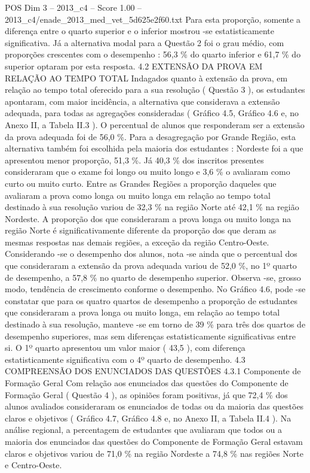 \begin{textsample}{POS Dim 3 – 2013\_c4 – Score 1.00 – 2013\_c4/enade\_2013\_med\_vet\_5d625e2f60.txt}
Para esta proporção, somente a diferença entre o quarto superior e o inferior mostrou -se estatisticamente significativa.
Já a alternativa modal para a Questão 2 foi o grau médio, com proporções crescentes com o desempenho : 56,3 \% do quarto inferior e 61,7 \% do superior optaram por esta resposta. 4.2 EXTENSÃO DA PROVA EM RELAÇÃO AO TEMPO TOTAL Indagados quanto à extensão da prova, em relação ao tempo total oferecido para a sua resolução ( Questão 3 ), os estudantes apontaram, com maior incidência, a alternativa que considerava a extensão adequada, para todas as agregações consideradas ( Gráfico 4.5, Gráfico 4.6 e, no Anexo II, a Tabela II.3 ).
O percentual de alunos que responderam ser a extensão da prova adequada foi de 56,0 \%.
Para a desagregação por Grande Região, esta alternativa também foi escolhida pela maioria dos estudantes : Nordeste foi a que apresentou menor proporção, 51,3 \%.
Já 40,3 \% dos inscritos presentes consideraram que o exame foi longo ou muito longo e 3,6 \% o avaliaram como curto ou muito curto.
Entre as Grandes Regiões a proporção daqueles que avaliaram a prova como longa ou muito longa em relação ao tempo total destinado à sua resolução variou de 32,3 \% na região Norte até 42,1 \% na região Nordeste.
A proporção dos que consideraram a prova longa ou muito longa na região Norte é significativamente diferente da proporção dos que deram as mesmas respostas nas demais regiões, a exceção da região Centro-Oeste.
Considerando -se o desempenho dos alunos, nota -se ainda que o percentual dos que consideraram a extensão da prova adequada variou de 52,0 \%, no 1º quarto de desempenho, a 57,8 \% no quarto de desempenho superior.
Observa -se, grosso modo, tendência de crescimento conforme o desempenho.
No Gráfico 4.6, pode -se constatar que para os quatro quartos de desempenho a proporção de estudantes que consideraram a prova longa ou muito longa, em relação ao tempo total destinado à sua resolução, manteve -se em torno de 39 \% para três dos quartos de desempenho superiores, mas sem diferenças estatisticamente significativas entre si.
O 1º quarto apresentou um valor maior ( 43,5 ), com diferença estatisticamente significativa com o 4º quarto de desempenho. 4.3 COMPREENSÃO DOS ENUNCIADOS DAS QUESTÕES 4.3.1 Componente de Formação Geral Com relação aos enunciados das questões do Componente de Formação Geral ( Questão 4 ), as opiniões foram positivas, já que 72,4 \% dos alunos avaliados consideraram os enunciados de todas ou da maioria das questões claros e objetivos ( Gráfico 4.7, Gráfico 4.8 e, no Anexo II, a Tabela II.4 ).
Na análise regional, a percentagem de estudantes que avaliaram que todos ou a maioria dos enunciados das questões do Componente de Formação Geral estavam claros e objetivos variou de 71,0 \% na região Nordeste a 74,8 \% nas regiões Norte e Centro-Oeste.

\end{textsample}
